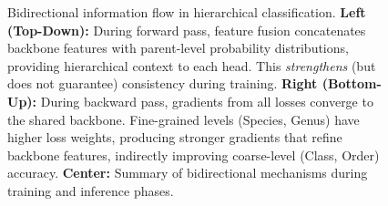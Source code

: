 \documentclass[twocolumn]{article}
\begin{document}
\begin{figure}[t]

\caption{Bidirectional information flow in hierarchical classification. 
\textbf{Left (Top-Down):} During forward pass, feature fusion concatenates backbone features with parent-level probability distributions, providing hierarchical context to each head. This \textit{strengthens} (but does not guarantee) consistency during training.
\textbf{Right (Bottom-Up):} During backward pass, gradients from all losses converge to the shared backbone. Fine-grained levels (Species, Genus) have higher loss weights, producing stronger gradients that refine backbone features, indirectly improving coarse-level (Class, Order) accuracy.
\textbf{Center:} Summary of bidirectional mechanisms during training and inference phases.}
\label{fig:bidirectional_mechanism}
\end{figure}
\end{document}

